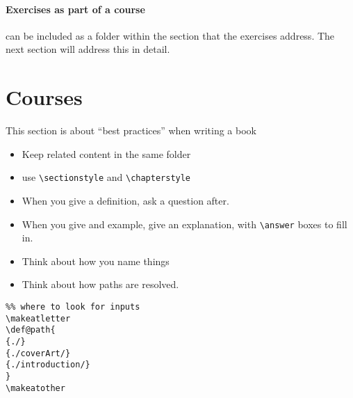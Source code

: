 \documentclass{ximera}
\begin{document}
\paragraph{Exercises as part of a course} can be included as a folder within the section that the exercises address. The next section will address this in detail. 







    \section{Courses}

    This section is about ``best practices'' when writing a book
    \begin{itemize}
      \item Keep related content in the same folder
      \item use \texttt{\textbackslash sectionstyle} and
            \texttt{\textbackslash chapterstyle}
      \item When you give a definition, ask a question after.
      \item When you give and example, give an explanation, with
            \texttt{\textbackslash answer} boxes to fill in.
      \item Think about how you name things
      \item Think about how paths are resolved.
    \end{itemize}

    \begin{verbatim}
%% where to look for inputs
\makeatletter
\def@path{
{./}
{./coverArt/}
{./introduction/}
}
\makeatother
\end{verbatim}
    \pdfOnly{\end{multicols}}
\end{document}
